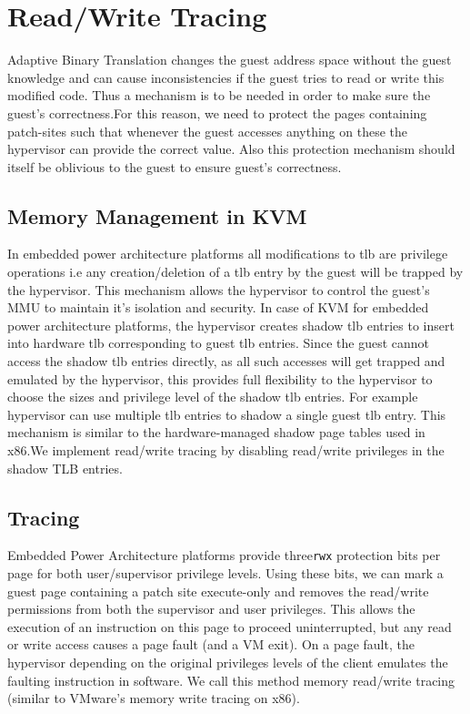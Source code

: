 \chapter{Read/Write Tracing}\label{ch:3}
\label{sec:memory_tracing}
Adaptive Binary Translation changes the guest address space without the guest knowledge and can cause inconsistencies if the guest tries to read or write this modified code. Thus a mechanism is to be needed in order to make sure the guest's correctness.For this reason, we need to protect the pages containing patch-sites such that whenever the guest accesses anything on these the hypervisor can provide the correct value. Also this protection mechanism should itself be oblivious to the guest to ensure guest's correctness. 

\section{Memory Management in KVM}
\label{memory_management}
In embedded power architecture platforms all modifications to tlb are privilege operations i.e any creation/deletion of a tlb entry by the guest will be trapped by the hypervisor. This mechanism allows the hypervisor to control the guest's MMU to maintain it's isolation and security. In case of KVM for embedded power architecture platforms, the hypervisor creates shadow tlb entries to insert into hardware tlb corresponding to guest tlb entries. Since the guest cannot access the shadow tlb entries directly, as all such accesses will get trapped and emulated by the hypervisor, this provides full flexibility to the hypervisor to choose the sizes and privilege level of the shadow tlb entries. For example hypervisor can use multiple tlb entries to shadow a single guest tlb entry. This mechanism is similar to the hardware-managed shadow page tables used in x86\cite{adams:asplos06}.We implement read/write tracing by disabling read/write privileges in the shadow TLB entries.

\section{Tracing}
Embedded Power Architecture platforms provide three{\tt rwx} protection bits per page for both user/supervisor privilege levels. Using these bits, we can mark a guest page containing a patch site execute-only and removes the read/write permissions from both the supervisor and user privileges. This allows the execution of an instruction on this page to proceed uninterrupted, but any read or write access causes a page fault (and a VM exit). On a page fault, the hypervisor depending on the original privileges levels of the client emulates the faulting instruction in software. We call this method memory read/write tracing (similar to VMware's memory write tracing on x86\cite{adams:asplos06}). 

